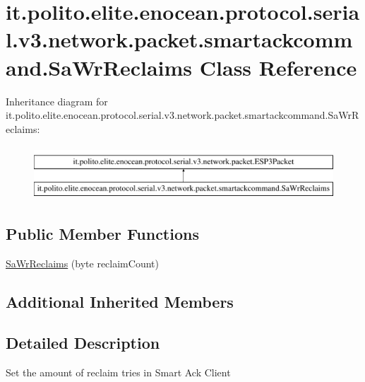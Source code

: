 \hypertarget{classit_1_1polito_1_1elite_1_1enocean_1_1protocol_1_1serial_1_1v3_1_1network_1_1packet_1_1smartackcommand_1_1_sa_wr_reclaims}{}\section{it.\+polito.\+elite.\+enocean.\+protocol.\+serial.\+v3.\+network.\+packet.\+smartackcommand.\+Sa\+Wr\+Reclaims Class Reference}
\label{classit_1_1polito_1_1elite_1_1enocean_1_1protocol_1_1serial_1_1v3_1_1network_1_1packet_1_1smartackcommand_1_1_sa_wr_reclaims}
Inheritance diagram for it.\+polito.\+elite.\+enocean.\+protocol.\+serial.\+v3.\+network.\+packet.\+smartackcommand.\+Sa\+Wr\+Reclaims\+:\begin{figure}[H]
\begin{center}
\leavevmode
\includegraphics[height=2.000000cm]{classit_1_1polito_1_1elite_1_1enocean_1_1protocol_1_1serial_1_1v3_1_1network_1_1packet_1_1smartackcommand_1_1_sa_wr_reclaims}
\end{center}
\end{figure}
\subsection*{Public Member Functions}
\begin{DoxyCompactItemize}
\item 
\hyperlink{classit_1_1polito_1_1elite_1_1enocean_1_1protocol_1_1serial_1_1v3_1_1network_1_1packet_1_1smartackcommand_1_1_sa_wr_reclaims_a276fad35e07fe4075a5fac13ff0312f3}{Sa\+Wr\+Reclaims} (byte reclaim\+Count)
\end{DoxyCompactItemize}
\subsection*{Additional Inherited Members}


\subsection{Detailed Description}
Set the amount of reclaim tries in Smart Ack Client

